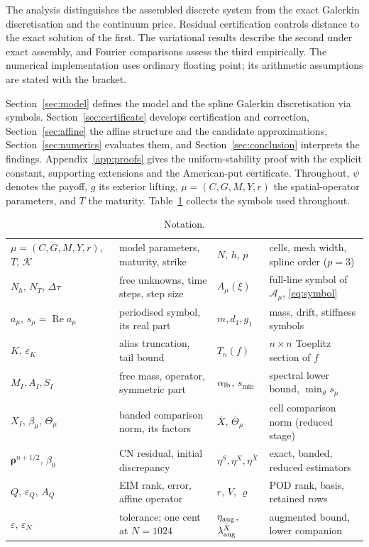 \documentclass[11pt]{amsart}
\theoremstyle{remark}
\newcommand{\dt}{\Delta\tau}
\newcommand{\rr}{\bm\rho}
\newcommand{\Aop}{\mathcal A_\mu}
\DeclareMathOperator{\Real}{Re}
\newcommand{\Tn}[2]{T_{#1}(#2)}          %
\newcommand{\sym}[1]{#1}                 %
\newcommand{\smin}{s_{\min}}
\newcommand{\Thmu}{\Theta_\mu}
\begin{document}
The analysis distinguishes the assembled discrete system from the exact
Galerkin discretisation and the continuum price. Residual certification
controls distance to the exact solution of the first. The variational
results describe the second under exact assembly, and Fourier comparisons
assess the third empirically. The numerical implementation uses ordinary
floating point; its arithmetic assumptions are stated with the bracket.

Section~\ref{sec:model} defines the model and the spline Galerkin discretisation via symbols.
Section~\ref{sec:certificate} develops certification and correction,
Section~\ref{sec:affine} the affine structure and the candidate approximations,
Section~\ref{sec:numerics} evaluates them, and
Section~\ref{sec:conclusion} interprets the findings.
Appendix~\ref{app:proofs} gives the uniform-stability proof with the explicit
constant, supporting extensions and the American-put certificate. Throughout, $\psi$ denotes the payoff, $g$ its exterior lifting,
$\mu=(C,G,M,Y,r)$ the spatial-operator parameters, and $T$ the maturity.
Table~\ref{tab:notation} collects the symbols used throughout.
\begin{table}[ht]
\centering\footnotesize
\caption{Notation.}
\label{tab:notation}
\begin{tabular}{@{}l@{\ \ }>{\raggedright\arraybackslash}p{4.6cm}@{\quad}l@{\ \ }>{\raggedright\arraybackslash}p{4.6cm}@{}}
\toprule
$\mu=(C,G,M,Y,r)$, $T$, $\mathcal K$ & model parameters, maturity, strike &
$N$, $h$, $p$ & cells, mesh width, spline order ($p=3$)\\
$N_h$, $N_T$, $\dt$ & free unknowns, time steps, step size &
$A_\mu(\xi)$ & full-line symbol of $\Aop$, \eqref{eq:symbol}\\
$\sym{a}_\mu$, $\sym{s}_\mu=\Real\sym{a}_\mu$ & periodised symbol, its real part &
$\sym{m},\sym{d}_1,\sym{g}_1$ & mass, drift, stiffness symbols\\
$K$, $\varepsilon_K$ & alias truncation, tail bound &
$\Tn{n}{f}$ & $n\times n$ Toeplitz section of $f$\\
$M_I,A_I,S_I$ & free mass, operator, symmetric part &
$\alpha_{\rm lb}$, $\smin$ & spectral lower bound, $\min_\vartheta\sym{s}_\mu$\\
$X_I$, $\beta_\mu$, $\Thmu$ & banded comparison norm, its factors &
$\bar X$, $\bar\Theta_\mu$ & cell comparison norm (reduced stage)\\
$\rr^{n+1/2}$, $\beta_0$ & CN residual, initial discrepancy &
$\eta^S,\eta^X,\eta^{\bar X}$ & exact, banded, reduced estimators\\
$Q$, $\varepsilon_Q$, $A_Q$ & EIM rank, error, affine operator &
$r$, $V$, $\varrho$ & POD rank, basis, retained rows\\
$\varepsilon$, $\varepsilon_N$ & tolerance; one cent at $N=1024$ &
$\eta_{\rm aug}$, $\lambda^{\bar X}_{\rm aug}$ & augmented bound, lower companion\\
\bottomrule
\end{tabular}
\end{table}
\end{document}

